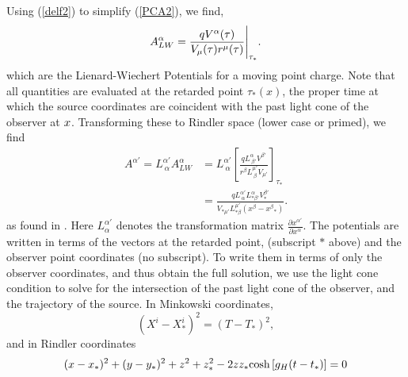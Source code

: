 Using (\ref{delf2}) to simplify (\ref{PCA2}), we find,
\begin{equation}
A_{LW}^{\alpha} = \frac{  q V^{\alpha} (\tau) }{  V_{\mu}(\tau) r^{\mu}(\tau)  } \Bigg{|}_{\tau_*}.
\label{LWMink}
\end{equation}
which are the Lienard-Wiechert Potentials for a moving point charge. Note that all quantities are evaluated at the retarded point $\tau_*(x)$, the proper time at which the source coordinates are coincident with the past light cone of the observer at ${x}$. Transforming these to Rindler space (lower case or primed), we find
\begin{align}
A^{\alpha'} = L^{\alpha'}_{ {\ \alpha}} A_{LW}^{\alpha} &=  L^{\alpha'}_{ {\ \alpha}} \left[ \frac{  q  L^{\alpha}_{{\ \beta'}} V^{\beta'}  }{  r^{\beta}   L^{\mu'}_{{\ \beta}} V_{\mu'}  } \right]_{\tau_*} \nonumber \\
&=  \frac{  q  L^{\alpha'}_{ {\ \alpha}}  L^{\alpha}_{* { \beta'}} V_*^{\beta'}  }{  V_{* \mu'} L^{\mu'}_{* {\beta}}  \left( {x}^{\beta} - {x^{\beta}}_* \right)   } .
\label{LWRind}
\end{align}
as found in \cite{MP3_MS:1985}. Here $L^{\alpha'}_{{\alpha}}$ denotes the transformation matrix $\frac{\partial x^{\alpha'}}{\partial x^{\alpha}}$. The potentials are written in terms of the vectors at the retarded point, (subscript $*$ above) and the observer point coordinates (no subscript). To write them in terms of only the observer coordinates, and thus obtain the full solution, we use the light cone condition to solve for the intersection of the past light cone of the observer, and the trajectory of the source.  In Minkowski coordinates,
\begin{equation}
(X^i-X^i_*)^2= (T-T_*)^2,
\end{equation}
and in Rindler coordinates
\begin{equation}
(x-x_*)^2 + (y-y_*)^2 + z^2 + z^2_* -2z z_* \hbox{cosh}\left[g_H(t-t_*)\right] = 0
\label{LC}
\end{equation}




